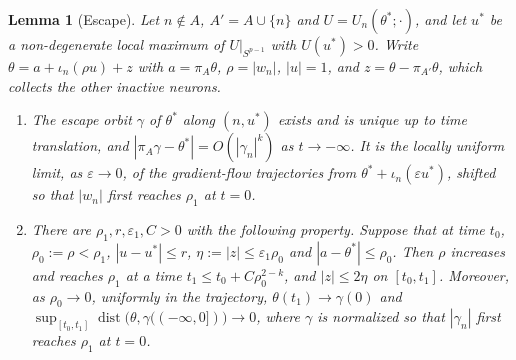 \documentclass[11pt]{article}
\newtheorem{lemma}{Lemma}
\theoremstyle{definition}
\theoremstyle{remark}
\newcommand{\eps}{\varepsilon}
\begin{document}
\begin{lemma}[Escape]\label{lem:escape}
Let $n\notin A$, $A'=A\cup\{n\}$ and $U=U_n(\theta^*;\cdot)$, and let $u^*$ be a non-degenerate local maximum of $U|_{S^{p-1}}$ with $U(u^*)>0$. Write $\theta=a+\iota_n(\rho u)+z$ with $a=\pi_A\theta$, $\rho=|w_n|$, $|u|=1$, and $z=\theta-\pi_{A'}\theta$, which collects the other inactive neurons.
\begin{enumerate}[label=\textup{(\alph*)},nosep]
\item The escape orbit $\gamma$ of $\theta^*$ along $(n,u^*)$ exists and is unique up to time translation, and $|\pi_A\gamma-\theta^*|=O(|\gamma_n|^k)$ as $t\to-\infty$. It is the locally uniform limit, as $\eps\to0$, of the gradient-flow trajectories from $\theta^*+\iota_n(\eps u^*)$, shifted so that $|w_n|$ first reaches $\rho_1$ at $t=0$.
\item There are $\rho_1,r,\eps_1,C>0$ with the following property. Suppose that at time $t_0$, $\rho_0:=\rho<\rho_1$, $|u-u^*|\le r$, $\eta:=|z|\le\eps_1\rho_0$ and $|a-\theta^*|\le\rho_0$. Then $\rho$ increases and reaches $\rho_1$ at a time $t_1\le t_0+C\rho_0^{2-k}$, and $|z|\le2\eta$ on $[t_0,t_1]$. Moreover, as $\rho_0\to0$, uniformly in the trajectory, $\theta(t_1)\to\gamma(0)$ and $\sup_{[t_0,t_1]}\operatorname{dist}\big(\theta,\gamma((-\infty,0])\big)\to0$, where $\gamma$ is normalized so that $|\gamma_n|$ first reaches $\rho_1$ at $t=0$.
\end{enumerate}
\end{lemma}
\end{document}
